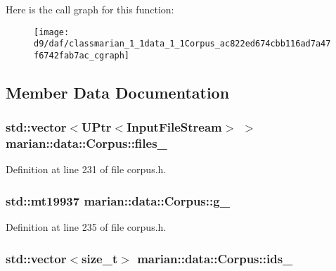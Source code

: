 Here is the call graph for this function\+:
\nopagebreak
\begin{figure}[H]
\begin{center}
\leavevmode
\texttt{[image: d9/daf/classmarian\_1\_1data\_1\_1Corpus\_ac822ed674cbb116ad7a47f6742fab7ac\_cgraph]}
\end{center}
\end{figure}




\subsection{Member Data Documentation}
\subsubsection[{\texorpdfstring{files\+\_\+}{files_}}]{\setlength{\rightskip}{0pt plus 5cm}std\+::vector$<${\bf U\+Ptr}$<${\bf Input\+File\+Stream}$>$ $>$ marian\+::data\+::\+Corpus\+::files\+\_\+\hspace{0.3cm}{\ttfamily [private]}}\hypertarget{classmarian_1_1data_1_1Corpus_a3f3028cb2032b3b4629883fb48328851}{}\label{classmarian_1_1data_1_1Corpus_a3f3028cb2032b3b4629883fb48328851}


Definition at line 231 of file corpus.\+h.

\subsubsection[{\texorpdfstring{g\+\_\+}{g_}}]{\setlength{\rightskip}{0pt plus 5cm}std\+::mt19937 marian\+::data\+::\+Corpus\+::g\+\_\+\hspace{0.3cm}{\ttfamily [private]}}\hypertarget{classmarian_1_1data_1_1Corpus_af02635ddeb7bd28cf197b7167326aeea}{}\label{classmarian_1_1data_1_1Corpus_af02635ddeb7bd28cf197b7167326aeea}


Definition at line 235 of file corpus.\+h.

\subsubsection[{\texorpdfstring{ids\+\_\+}{ids_}}]{\setlength{\rightskip}{0pt plus 5cm}std\+::vector$<$size\+\_\+t$>$ marian\+::data\+::\+Corpus\+::ids\+\_\+\hspace{0.3cm}{\ttfamily [private]}}\hypertarget{classmarian_1_1data_1_1Corpus_af61cc6f764d82fa6764d7faa6c7c29d8}{}\label{classmarian_1_1data_1_1Corpus_af61cc6f764d82fa6764d7faa6c7c29d8}


